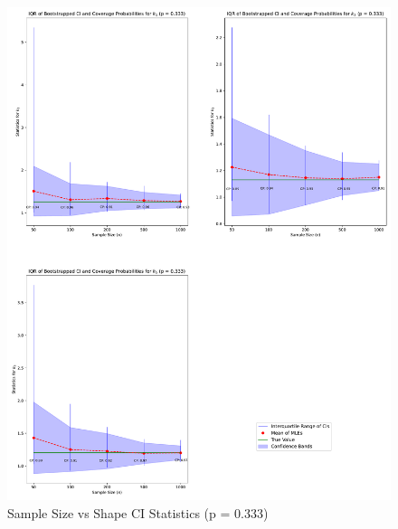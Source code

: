 \documentclass[
]{article}
\begin{document}
\begin{figure}

{\centering \includegraphics{image/plot-n-vs-stats-p333-shape} 

}

\caption{Sample Size vs Shape CI Statistics (p = 0.333)}\label{fig:samp-size-n-vs-stats-p333-scale}
\end{figure}
\end{document}
